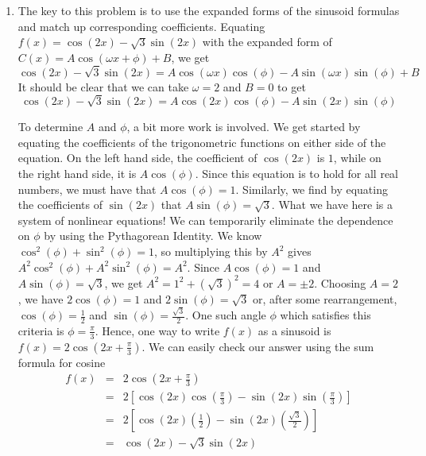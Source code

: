 \medskip

{\begin{enumerate}

\item The key to this problem is to use the expanded forms of the sinusoid formulas and match up corresponding coefficients.  Equating   $f(x) = \cos(2x) - \sqrt{3} \sin(2x)$ with the expanded form of $C(x) = A \cos(\omega x + \phi) + B$, we get
\[
 \cos(2x) - \sqrt{3} \sin(2x) = A\cos(\omega x) \cos(\phi) - A \sin(\omega x)\sin(\phi) + B
\]
It should be clear that we can take $\omega = 2$ and $B = 0$ to get
\[
 \cos(2x) - \sqrt{3} \sin(2x) = A\cos(2x) \cos(\phi) - A \sin(2x)\sin(\phi) 
\]

To determine $A$ and $\phi$, a bit more work is involved.  We get started by equating the coefficients of the trigonometric functions on either side of the equation.  On the left hand side, the coefficient of $\cos(2x)$ is $1$, while on the right hand side, it is $A \cos(\phi)$.  Since this equation is to hold for all real numbers, we must have that $A \cos(\phi) = 1$.   Similarly, we find by equating the coefficients of $\sin(2x)$ that $A \sin(\phi) = \sqrt{3}$. What we have here is a system of nonlinear equations!  We can temporarily eliminate the dependence on $\phi$ by using the Pythagorean Identity.  We know $\cos^{2}(\phi) + \sin^{2}(\phi) = 1$, so multiplying this by $A^2$ gives $A^2\cos^{2}(\phi) + A^2\sin^{2}(\phi) = A^2$.  Since $A \cos(\phi) = 1$ and $A \sin(\phi) = \sqrt{3}$, we get $A^2 = 1^2 + (\sqrt{3})^2 = 4$ or $A = \pm 2$.  Choosing $A = 2$, we have $2\cos(\phi) = 1$ and $2 \sin(\phi) = \sqrt{3}$ or, after some rearrangement, $\cos(\phi) = \frac{1}{2}$ and $\sin(\phi) = \frac{\sqrt{3}}{2}$.  One such angle $\phi$ which satisfies this criteria is $\phi = \frac{\pi}{3}$.  Hence, one way to write $f(x)$ as a sinusoid is  $f(x) = 2 \cos\left(2x + \frac{\pi}{3}\right)$.   We can easily check our answer using the sum formula for cosine  \[\begin{array}{rcl} f(x) &  = &  2 \cos\left(2x + \frac{\pi}{3}\right) \\ [3pt] & = &  2 \left[ \cos(2x) \cos\left(\frac{\pi}{3}\right) - \sin(2x) \sin\left(\frac{\pi}{3}\right) \right]\\ [3pt] & = & 2 \left[ \cos(2x) \left(\frac{1}{2}\right) - \sin(2x) \left(\frac{\sqrt{3}}{2}\right)\right] \\ [3pt] & = & \cos(2x) - \sqrt{3} \sin(2x) \\ \end{array}\]


\end{enumerate}}
